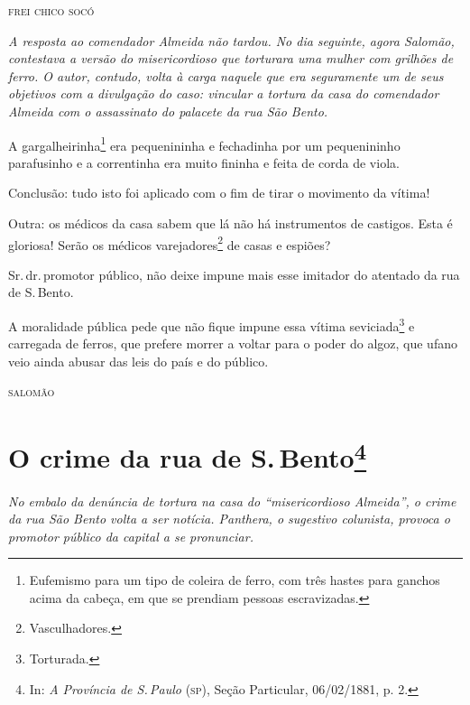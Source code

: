 \medskip
\hfill\textsc{frei chico socó}


\begin{resumo}
\emph{A resposta ao comendador Almeida não tardou. No dia seguinte,
agora Salomão, contestava a versão do misericordioso que
torturara uma mulher com grilhões de ferro. O autor, contudo, volta à carga naquele que era seguramente um
de seus objetivos com a divulgação do caso: vincular a tortura da casa
do comendador Almeida com o assassinato do palacete da rua São Bento. }
\end{resumo}

A gargalheirinha\footnote{Eufemismo para um tipo de coleira de ferro,
  com três hastes para ganchos acima da cabeça, em que se prendiam
  pessoas escravizadas.} era pequenininha e fechadinha por um
pequenininho parafusinho e a correntinha era muito fininha e feita de
corda de viola.

Conclusão: tudo isto foi aplicado com o fim de tirar o movimento da
vítima!

Outra: os médicos da casa sabem que lá não há instrumentos de castigos.
Esta é gloriosa! Serão os médicos varejadores\footnote{Vasculhadores.}
de casas e espiões?

Sr.\,dr.\,promotor público, não deixe impune mais esse imitador do
atentado da rua de S.\,Bento.

A moralidade pública pede que não fique impune essa vítima
seviciada\footnote{Torturada.}
e carregada de ferros, que
prefere morrer a voltar para o poder do algoz, que ufano veio ainda
abusar das leis do país e do público.

\hfill\textsc{salomão}

\chapter{O crime da rua de S.\,Bento\footnote{In: \emph{A Província
  de S.\,Paulo} (\textsc{sp}), Seção Particular, 06/02/1881, p. 2.}}

\begin{resumo}
\emph{No embalo da denúncia de tortura na casa do ``misericordioso
Almeida'', o crime da rua São Bento volta a ser notícia. Panthera,
o sugestivo colunista, provoca o promotor público da capital a se
pronunciar. }
\end{resumo}

